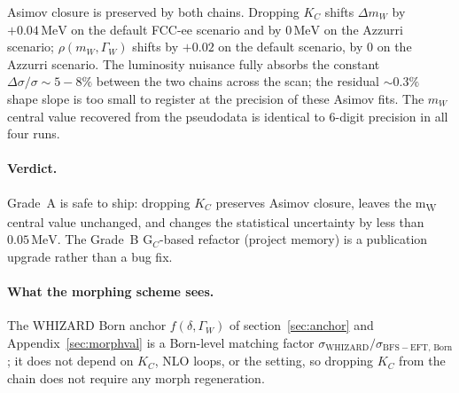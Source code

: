 \documentclass[11pt,a4paper]{article}
\newcommand{\code}[1]{\texttt{\detokenize{#1}}}
\newcommand{\mW}{m_W}
\newcommand{\GammaW}{\Gamma_W}
\newcommand{\MeV}{\ensuremath{\,\mathrm{MeV}}}
\begin{document}
\noindent
Asimov closure is preserved by both chains. Dropping $K_C$ shifts
$\Delta\mW$ by $+0.04\MeV$ on the default FCC-ee scenario
and by $0\MeV$ on the Azzurri scenario; $\rho(\mW,\GammaW)$
shifts by $+0.02$ on the default scenario, by $0$ on the Azzurri
scenario. The luminosity nuisance fully absorbs the constant
$\Delta\sigma/\sigma \sim 5{-}8\%$ between the two chains across the
scan; the residual $\sim 0.3\%$ shape slope is too small to register
at the precision of these Asimov fits. The $\mW$ central value
recovered from the pseudodata is identical to 6-digit precision in
all four runs.

\paragraph{Verdict.} Grade~A is safe to ship: dropping $K_C$
preserves Asimov closure, leaves the m\textsubscript{W} central value
unchanged, and changes the statistical uncertainty by less than
$0.05\MeV$. The Grade~B G$_C$-based refactor (project memory) is a
publication upgrade rather than a bug fix.

\paragraph{What the morphing scheme sees.} The WHIZARD Born anchor
$f(\delta,\GammaW)$ of section~\ref{sec:anchor} and
Appendix~\ref{sec:morphval} is a Born-level matching factor
$\sigma_\mathrm{WHIZARD}/\sigma_\mathrm{BFS-EFT,\,Born}$; it does not
depend on $K_C$, NLO loops, or the \code{coulomb_kc_safe} setting,
so dropping $K_C$ from the chain does not require any morph
regeneration.
\end{document}
